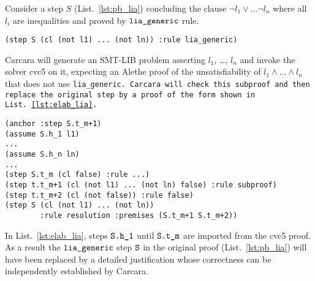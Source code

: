 \begin{example}
%
Consider a step $S$ (List.~\ref{lst:pb_lia}) concluding the clause $\neg l_1 \lor \dots \neg l_n$ where all $l_i$ are inequalities and proved by $\tt{lia\_generic}$ rule.
    
\begin{lstlisting}[language=SMT,caption={Elaborated proof},label={lst:pb_lia}]
    (step S (cl (not l1) ... (not ln)) :rule lia_generic)
\end{lstlisting}
%
Carcara will generate an SMT-LIB problem asserting $l_1$, \dots, $l_n$ and invoke the solver cvc5 on it, expecting an Alethe proof of the unsatisfiability of $l_1 \land \dots \land l_n$
that does not use \tt{lia\_generic}. Carcara will check this subproof and then replace the original step by a proof of the form shown in List.~\ref{lst:elab_lia}.

\begin{lstlisting}[language=SMT,caption={Elaboration of \tt{lia\_generic}},label={lst:elab_lia}]
(anchor :step S.t_m+1)
(assume S.h_1 l1)
...
(assume S.h_n ln)
...
(step S.t_m (cl false) :rule ...)
(step t.t_m+1 (cl (not l1) ... (not ln) false) :rule subproof)
(step t.t_m+2 (cl (not false)) :rule false)
(step S (cl (not l1) ... (not ln)) 
        :rule resolution :premises (S.t_m+1 S.t_m+2))
\end{lstlisting}

In List.~\ref{lst:elab_lia}, steps $\tt{S.h\_1}$ until $\tt{S.t\_m}$ are imported from the cvc5 proof.
As a result the $\tt{lia\_generic}$ step $\tt{S}$ in the original proof (List.~\ref{lst:pb_lia}) will have been replaced by a detailed justification whose correctness can be independently established by Carcara.

\end{example}
